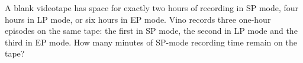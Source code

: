 A blank videotape has space for exactly two hours of recording in SP mode, four hours in LP mode, or six hours in EP mode. Vino records three one-hour episodes on the same tape: the first in SP mode, the second in LP mode and the third in EP mode. How many minutes of SP-mode recording time remain on the tape?

